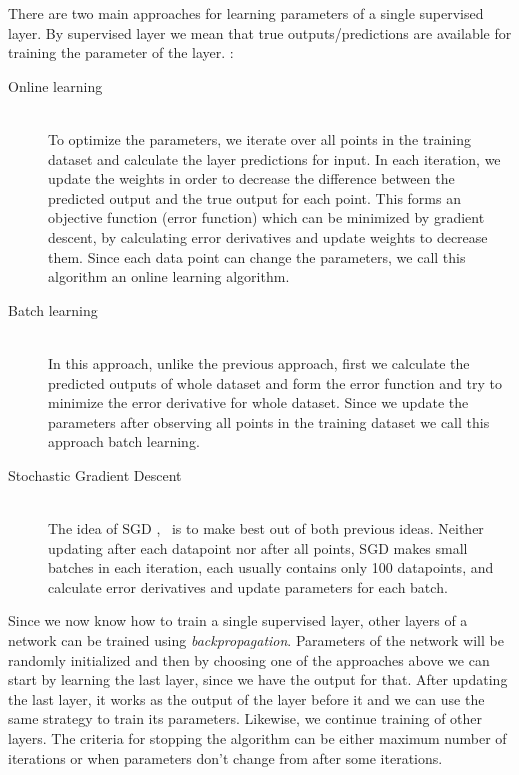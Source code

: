 There are two main approaches for learning parameters of a single supervised
layer. By supervised layer we mean that true outputs/predictions are available
for training the parameter of the layer. :
\begin{description}
  \item[Online learning] \hfil \\
    To optimize the parameters, we
    iterate over all points in the training dataset and calculate the layer
    predictions for input. In each iteration, we update the weights in order to
    decrease the difference between the predicted output and the true output for
    each point. This forms an objective function (error function) which can be
    minimized by gradient descent, by calculating error derivatives and update
    weights to decrease them.\cite{Bengio2012}
    Since each data point can change the parameters, we call this algorithm an online learning algorithm.
  \item[Batch learning] \hfil \\
  In this approach, unlike the previous approach, first we calculate the
  predicted outputs of whole dataset and form the error function and try to
  minimize the error derivative for whole dataset. Since we update the
  parameters after observing all points in the training dataset we call this
  approach batch learning.\cite{Braspenning1995}
  
  \item[Stochastic Gradient Descent] \hfil \\
  The idea of SGD \cite{Bottou2010},~\cite{Bengio2012} is to make best out of both
  previous ideas.
  Neither updating after each datapoint nor after all points, SGD makes small batches in each
  iteration, each usually contains only 100 datapoints, and calculate error
  derivatives and update parameters for each batch.
  
  
\end{description} 

Since we now know how to train a single supervised layer, other layers of a
network can be trained using \textit{backpropagation}. Parameters of the network
will be randomly initialized and then by choosing one of the approaches above we
can start by learning the last layer, since we have the output for that. After
updating the last layer, it works as the output of the layer before it and we
can use the same strategy to train its parameters. Likewise, we continue
training of other layers. The criteria for stopping the algorithm can be either
maximum number of iterations or when parameters don't change from after some
iterations.

